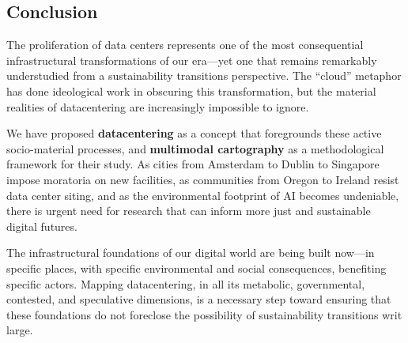 \documentclass[../../main.tex]{subfiles}
\begin{document}
\subsection{Conclusion}

The proliferation of data centers represents one of the most consequential infrastructural transformations of our era---yet one that remains remarkably understudied from a sustainability transitions perspective. The ``cloud'' metaphor has done ideological work in obscuring this transformation, but the material realities of datacentering are increasingly impossible to ignore.

We have proposed \textbf{datacentering} as a concept that foregrounds these active socio-material processes, and \textbf{multimodal cartography} as a methodological framework for their study. As cities from Amsterdam to Dublin to Singapore impose moratoria on new facilities, as communities from Oregon to Ireland resist data center siting, and as the environmental footprint of AI becomes undeniable, there is urgent need for research that can inform more just and sustainable digital futures.

\begin{kaobox}[title=The Cloud Has a Geography]
The infrastructural foundations of our digital world are being built now---in specific places, with specific environmental and social consequences, benefiting specific actors. Mapping datacentering, in all its metabolic, governmental, contested, and speculative dimensions, is a necessary step toward ensuring that these foundations do not foreclose the possibility of sustainability transitions writ large.
\end{kaobox}
\end{document}
